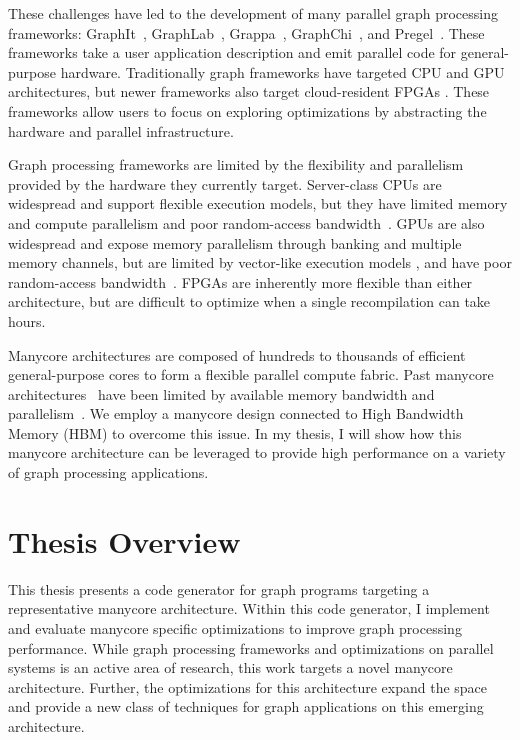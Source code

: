 These challenges have led to the development of many parallel graph processing frameworks: GraphIt~\cite{zhang2018graphit}, GraphLab~\cite{low2010graphlab, low2012distributed}, Grappa~\cite{nelson2015grappa}, GraphChi~\cite{aapo2012graphchi}, and Pregel~\cite{malewicz2010pregel}. 
These frameworks take a user application description and emit parallel code for general-purpose hardware.
Traditionally graph frameworks have targeted CPU and GPU architectures, but newer frameworks also target cloud-resident FPGAs \cite{engelhardt2016gravf, dai2016fpgp}.
These frameworks allow users to focus on exploring optimizations by abstracting the hardware and parallel infrastructure.

Graph processing frameworks are limited by the flexibility and parallelism provided by the hardware they currently target.
Server-class CPUs are widespread and support flexible execution models, but they have limited memory and compute parallelism and poor random-access bandwidth~\citep{beamer2015locality}.
GPUs are also widespread and expose memory parallelism through banking and multiple memory channels, but are limited by vector-like execution models \cite{xu2014graph, shi2018graph}, and have poor random-access bandwidth~\citep{aamodt2018general}.
FPGAs are inherently more flexible than either architecture, but are difficult to optimize when a single recompilation can take hours. 
  
Manycore architectures are composed of hundreds to thousands of efficient general-purpose cores to form a flexible parallel compute fabric.
Past manycore architectures~\cite{ramey2011tilera, agathos2015parallela, gwennap2011adapteva} have been limited by available memory bandwidth and parallelism~\citep{loi2010efficient}.  We employ a manycore design connected to High Bandwidth Memory (HBM) \cite{jedec2020hbm, jouppi2017datacenter} to overcome this issue.
In my thesis, I will show how this manycore architecture can be leveraged to provide high performance on a variety of graph processing applications.


\section{Thesis Overview}
This thesis presents a code generator for graph programs targeting a representative manycore architecture. 
Within this code generator, I implement and evaluate manycore specific optimizations to improve graph processing performance. 
While graph processing frameworks and optimizations on parallel systems is an active area of research, this work targets a novel manycore architecture.
Further, the optimizations for this architecture expand the space and provide a new class of techniques for graph applications on this emerging architecture. 

